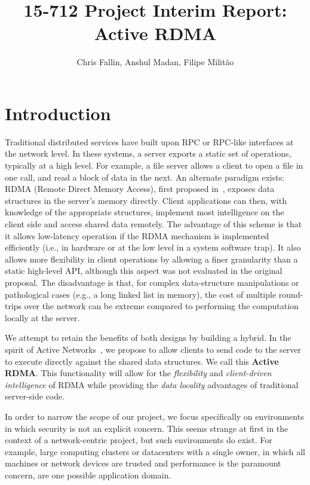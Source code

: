 \documentclass[10pt]{article}
\title{15-712 Project Interim Report: Active RDMA}
\author{Chris Fallin, Anshul Madan, Filipe Milit\~{a}o}
\date{}
\begin{document}
\maketitle

\section{Introduction}

Traditional distributed services have built upon RPC or RPC-like
interfaces at the network level. In these systems, a server exports a
static set of operations, typically at a high level. For example, a
file server allows a client to open a file in one call, and read a
block of data in the next. An alternate paradigm exists: RDMA (Remote
Direct Memory Access), first proposed in~\cite{thekkath94}, exposes
data structures in the server's memory directly. Client applications
can then, with knowledge of the appropriate structures, implement most
intelligence on the client side and access shared data remotely. The
advantage of this scheme is that it allows low-latency operation if
the RDMA mechanism is implemented efficiently (i.e., in hardware or at
the low level in a system software trap). It also allows more
flexibility in client operations by allowing a finer granularity than
a static high-level API, although this aspect was not evaluated in the
original proposal. The disadvantage is that, for complex
data-structure manipulations or pathological cases (e.g., a long
linked list in memory), the cost of multiple round-trips over the
network can be extreme compared to performing the computation locally
at the server.

We attempt to retain the benefits of both designs by building a
hybrid. In the spirit of Active Networks~\cite{AN-survey}, we propose
to allow clients to send code to the server to execute directly
against the shared data structures. We call this \textbf{Active
  RDMA}. This functionality will allow for the \emph{flexibility} and
\emph{client-driven intelligence} of RDMA while providing the
\emph{data locality} advantages of traditional server-side code.

In order to narrow the scope of our project, we focus specifically on
environments in which security is not an explicit concern. This seems
strange at first in the context of a network-centric project, but
such environments do exist. For example, large computing clusters or
datacenters with a single owner, in which all machines or network
devices are trusted and performance is the paramount concern, are one
possible application domain.
\end{document}
